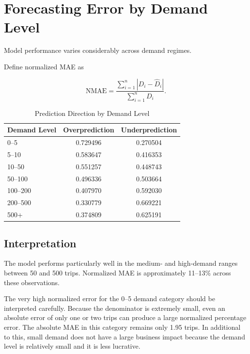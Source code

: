 \documentclass[11pt]{article}
\begin{document}
\section{Forecasting Error by Demand Level}

Model performance varies considerably across demand regimes.

Define normalized MAE as

\begin{equation}
\mathrm{NMAE}
=
\frac{
\sum_{i=1}^{n}
\left|
D_i-\widehat{D}_i
\right|
}{
\sum_{i=1}^{n} D_i
}.
\end{equation}

\begin{table}[htbp]
\centering
\caption{Prediction Direction by Demand Level}
\label{tab:prediction_direction}
\begin{tabular}{lcc}
\hline
\textbf{Demand Level} & \textbf{Overprediction} & \textbf{Underprediction} \\
\hline
0--5     & 0.729496 & 0.270504 \\
5--10    & 0.583647 & 0.416353 \\
10--50   & 0.551257 & 0.448743 \\
50--100  & 0.496336 & 0.503664 \\
100--200 & 0.407970 & 0.592030 \\
200--500 & 0.330779 & 0.669221 \\
500+     & 0.374809 & 0.625191 \\
\hline
\end{tabular}
\end{table}


\subsection{Interpretation}

The model performs particularly well in the medium- and high-demand
ranges between 50 and 500 trips. Normalized MAE is approximately
11--13\% across these observations.

The very high normalized error for the 0--5 demand category should
be interpreted carefully. Because the denominator is extremely
small, even an absolute error of only one or two trips can produce
a large normalized percentage error. The absolute MAE in this
category remains only 1.95 trips. In additional to this, small
demand does not have a large business impact because the demand
level is relatively small and it is less lucrative.
\end{document}

